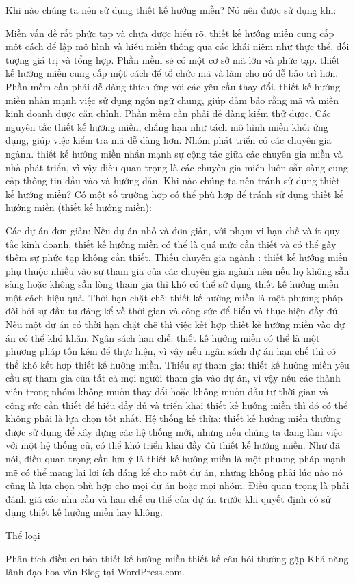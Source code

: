 Khi nào chúng ta nên sử dụng thiết kế hướng miền?
Nó nên được sử dụng khi:

Miền vấn đề rất phức tạp và chưa được hiểu rõ. thiết kế hướng miền cung cấp một cách để lập mô hình và hiểu miền thông qua các khái niệm như thực thể, đối tượng giá trị và tổng hợp.
Phần mềm sẽ có một cơ sở mã lớn và phức tạp. thiết kế hướng miền cung cấp một cách để tổ chức mã và làm cho nó dễ bảo trì hơn.
Phần mềm cần phải dễ dàng thích ứng với các yêu cầu thay đổi. thiết kế hướng miền nhấn mạnh việc sử dụng ngôn ngữ chung, giúp đảm bảo rằng mã và miền kinh doanh được căn chỉnh.
Phần mềm cần phải dễ dàng kiểm thử được. Các nguyên tắc thiết kế hướng miền, chẳng hạn như tách mô hình miền khỏi ứng dụng, giúp việc kiểm tra mã dễ dàng hơn.
Nhóm phát triển có các chuyên gia ngành. thiết kế hướng miền nhấn mạnh sự cộng tác giữa các chuyên gia miền và nhà phát triển, vì vậy điều quan trọng là các chuyên gia miền luôn sẵn sàng cung cấp thông tin đầu vào và hướng dẫn.
Khi nào chúng ta nên tránh sử dụng thiết kế hướng miền?
Có một số trường hợp có thể phù hợp để tránh sử dụng thiết kế hướng miền (thiết kế hướng miền):

Các dự án đơn giản: Nếu dự án nhỏ và đơn giản, với phạm vi hạn chế và ít quy tắc kinh doanh, thiết kế hướng miền có thể là quá mức cần thiết và có thể gây thêm sự phức tạp không cần thiết.
Thiếu chuyên gia ngành : thiết kế hướng miền phụ thuộc nhiều vào sự tham gia của các chuyên gia ngành nên nếu họ không sẵn sàng hoặc không sẵn lòng tham gia thì khó có thể sử dụng thiết kế hướng miền một cách hiệu quả.
Thời hạn chặt chẽ: thiết kế hướng miền là một phương pháp đòi hỏi sự đầu tư đáng kể về thời gian và công sức để hiểu và thực hiện đầy đủ. Nếu một dự án có thời hạn chặt chẽ thì việc kết hợp thiết kế hướng miền vào dự án có thể khó khăn.
Ngân sách hạn chế: thiết kế hướng miền có thể là một phương pháp tốn kém để thực hiện, vì vậy nếu ngân sách dự án hạn chế thì có thể khó kết hợp thiết kế hướng miền.
Thiếu sự tham gia: thiết kế hướng miền yêu cầu sự tham gia của tất cả mọi người tham gia vào dự án, vì vậy nếu các thành viên trong nhóm không muốn thay đổi hoặc không muốn đầu tư thời gian và công sức cần thiết để hiểu đầy đủ và triển khai thiết kế hướng miền thì đó có thể không phải là lựa chọn tốt nhất.
Hệ thống kế thừa: thiết kế hướng miền thường được sử dụng để xây dựng các hệ thống mới, nhưng nếu chúng ta đang làm việc với một hệ thống cũ, có thể khó triển khai đầy đủ thiết kế hướng miền.
Như đã nói, điều quan trọng cần lưu ý là thiết kế hướng miền là một phương pháp mạnh mẽ có thể mang lại lợi ích đáng kể cho một dự án, nhưng không phải lúc nào nó cũng là lựa chọn phù hợp cho mọi dự án hoặc mọi nhóm. Điều quan trọng là phải đánh giá các nhu cầu và hạn chế cụ thể của dự án trước khi quyết định có sử dụng thiết kế hướng miền hay không.

Thể loại

Phân tích
điều cơ bản
thiết kế hướng miền
thiết kế
câu hỏi thường gặp
Khả năng lãnh đạo
hoa văn
Blog tại WordPress.com.